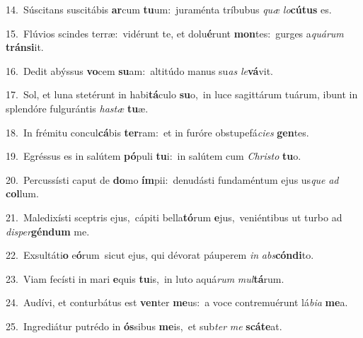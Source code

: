 {\numbfont\textcolor{\numbcolor}{14.}}~Súscitans suscitábis \textbf{ar}\-cum \textbf{tu}\-um:~\star juraménta tríbubus \textit{quæ} \textit{lo}\-\textbf{cú}\textbf{tus} es.\par
{\numbfont\textcolor{\numbcolor}{15.}}~Flúvios scindes terræ:~\dagger vidérunt te, et dolu\-\textbf{é}\-runt \textbf{mon}\-tes:~\star gurges a\-\textit{quá}\-\textit{rum} \textbf{tráns}\-\textbf{i}it.\par
{\numbfont\textcolor{\numbcolor}{16.}}~Dedit abýssus \textbf{vo}\-cem \textbf{su}\-am:~\star altitúdo manus su\textit{as} \textit{le}\-\textbf{vá}vit.\par
{\numbfont\textcolor{\numbcolor}{17.}}~Sol, et luna stetérunt in habi\-\textbf{tá}\-culo \textbf{su}\-o,~\star in luce sagittárum tuárum, ibunt in splendóre fulgurántis \textit{has}\-\textit{tæ} \textbf{tu}\-æ.\par
{\numbfont\textcolor{\numbcolor}{18.}}~In frémitu concul\-\textbf{cá}\-bis \textbf{ter}\-ram:~\star et in furóre obstupefá\-\textit{ci}\-\textit{es} \textbf{gen}\-tes.\par
{\numbfont\textcolor{\numbcolor}{19.}}~Egréssus es in salútem \textbf{pó}\-puli \textbf{tu}\-i:~\star in salútem cum \textit{Chris}\-\textit{to} \textbf{tu}\-o.\par
{\numbfont\textcolor{\numbcolor}{20.}}~Percussísti caput de \textbf{do}\-mo \textbf{ím}\-pii:~\star denudásti fundaméntum ejus us\textit{que} \textit{ad} \textbf{col}\-lum.\par
{\numbfont\textcolor{\numbcolor}{21.}}~Maledixísti sceptris ejus,~\dagger cápiti bella\-\textbf{tó}\-rum \textbf{e}\-jus,~\star veniéntibus ut turbo ad \textit{di}\-\textit{sper}\textbf{gén}\textbf{dum} me.\par
{\numbfont\textcolor{\numbcolor}{22.}}~Exsultáti\textbf{o} e\-\textbf{ó}\-rum~\star sicut ejus, qui dévorat páuperem \textit{in} \textit{abs}\-\textbf{cón}\textbf{di}to.\par
{\numbfont\textcolor{\numbcolor}{23.}}~Viam fecísti in mari \textbf{e}\-quis \textbf{tu}\-is,~\star in luto aquá\textit{rum} \textit{mul}\-\textbf{tá}rum.\par
{\numbfont\textcolor{\numbcolor}{24.}}~Audívi, et conturbátus est \textbf{ven}\-ter \textbf{me}\-us:~\star a voce contremuérunt lá\-\textit{bi}\-\textit{a} \textbf{me}\-a.\par
{\numbfont\textcolor{\numbcolor}{25.}}~Ingrediátur putrédo in \textbf{ós}\-sibus \textbf{me}\-is,~\star et sub\textit{ter} \textit{me} \textbf{scá}\-\textbf{te}at.\par
